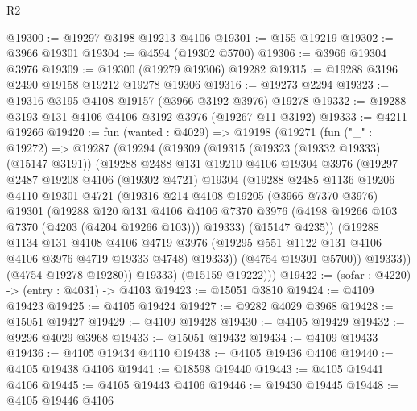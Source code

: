 \begin{lexlean}{R2}
\begin{coremodule}
@19300 := @19297 @3198 @19213 @4106
@19301 := @155 @19219
@19302 := @3966 @19301
@19304 := @4594 (@19302 @5700)
@19306 := @3966 @19304 @3976
@19309 := @19300 (@19279 @19306) @19282
@19315 := @19288 @3196 @2490 @19158 @19212 @19278 @19306
@19316 := @19273 @2294
@19323 := @19316 @3195 @4108 @19157 (@3966 @3192 @3976) @19278
@19332 := @19288 @3193 @131 @4106 @4106 @3192 @3976 (@19267 @11 @3192)
@19333 := @4211 @19266
@19420 := fun (wanted : @4029) =>
  @19198
    (@19271
      (fun ("_" : @19272) =>
      @19287
        (@19294
          (@19309
            (@19315
              (@19323 (@19332 @19333) (@15147 @3191))
              (@19288
                @2488
                @131
                @19210
                @4106
                @19304
                @3976
                (@19297
                  @2487
                  @19208
                  @4106
                  (@19302 @4721)
                  @19304
                  (@19288
                    @2485
                    @1136
                    @19206
                    @4110
                    @19301
                    @4721
                    (@19316
                      @214
                      @4108
                      @19205
                      (@3966 @7370 @3976)
                      @19301
                      (@19288
                        @120
                        @131
                        @4106
                        @4106
                        @7370
                        @3976
                        (@4198 @19266 @103 @7370 (@4203 (@4204 @19266 @103)))
                        @19333)
                      (@15147 @4235))
                    (@19288
                      @1134
                      @131
                      @4108
                      @4106
                      @4719
                      @3976
                      (@19295 @551 @1122 @131 @4106 @4106 @3976 @4719 @19333 @4748)
                      @19333))
                  (@4754 @19301 @5700))
                @19333))
            (@4754 @19278 @19280))
          @19333)
        (@15159 @19222)))
@19422 := (sofar : @4220) -> (entry : @4031) -> @4103
@19423 := @15051 @3810
@19424 := @4109 @19423
@19425 := @4105 @19424
@19427 := @9282 @4029 @3968
@19428 := @15051 @19427
@19429 := @4109 @19428
@19430 := @4105 @19429
@19432 := @9296 @4029 @3968
@19433 := @15051 @19432
@19434 := @4109 @19433
@19436 := @4105 @19434 @4110
@19438 := @4105 @19436 @4106
@19440 := @4105 @19438 @4106
@19441 := @18598 @19440
@19443 := @4105 @19441 @4106
@19445 := @4105 @19443 @4106
@19446 := @19430 @19445
@19448 := @4105 @19446 @4106

\end{coremodule}
\end{lexlean}
